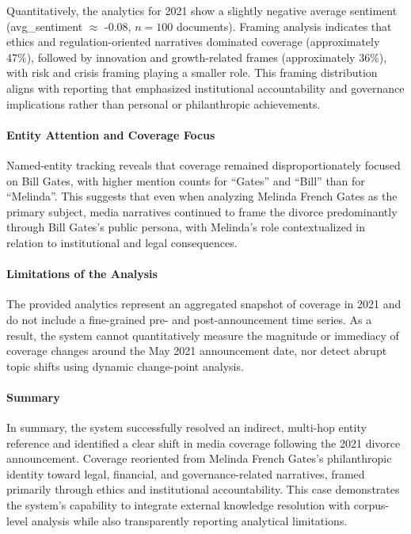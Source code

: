 Quantitatively, the analytics for 2021 show a slightly negative average sentiment (avg\_sentiment $\approx$ -0.08, $n=100$ documents). Framing analysis indicates that ethics and regulation-oriented narratives dominated coverage (approximately 47\%), followed by innovation and growth-related frames (approximately 36\%), with risk and crisis framing playing a smaller role. This framing distribution aligns with reporting that emphasized institutional accountability and governance implications rather than personal or philanthropic achievements.

\paragraph{Entity Attention and Coverage Focus}

Named-entity tracking reveals that coverage remained disproportionately focused on Bill Gates, with higher mention counts for ``Gates'' and ``Bill'' than for ``Melinda''. This suggests that even when analyzing Melinda French Gates as the primary subject, media narratives continued to frame the divorce predominantly through Bill Gates’s public persona, with Melinda’s role contextualized in relation to institutional and legal consequences.

\paragraph{Limitations of the Analysis}

The provided analytics represent an aggregated snapshot of coverage in 2021 and do not include a fine-grained pre- and post-announcement time series. As a result, the system cannot quantitatively measure the magnitude or immediacy of coverage changes around the May 2021 announcement date, nor detect abrupt topic shifts using dynamic change-point analysis.

\paragraph{Summary}

In summary, the system successfully resolved an indirect, multi-hop entity reference and identified a clear shift in media coverage following the 2021 divorce announcement. Coverage reoriented from Melinda French Gates’s philanthropic identity toward legal, financial, and governance-related narratives, framed primarily through ethics and institutional accountability. This case demonstrates the system’s capability to integrate external knowledge resolution with corpus-level analysis while also transparently reporting analytical limitations.

